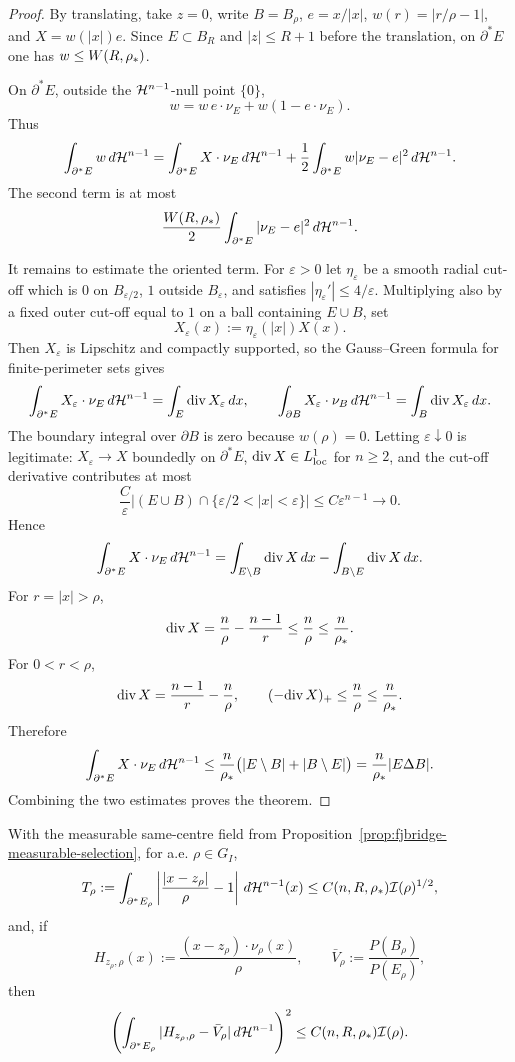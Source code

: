 \begin{proof}
By translating, take \(z=0\), write \(B=B_\rho\),
\(e=x/|x|\), \(w(r)=|r/\rho-1|\), and \(X=w(|x|)e\).  Since
\(E\subset B_R\) and \(|z|\le R+1\) before the translation, on
\(\partial^*E\) one has \(w\le W(R,\rho_*)\).

On \(\partial^*E\), outside the \(\mathcal H^{n-1}\)-null point \(\{0\}\),
\[
   w=w\,e\cdot\nu_E+w(1-e\cdot\nu_E).
\]
Thus
\[
   \int_{\partial^*E}w\,d\mathcal H^{n-1}
   =
   \int_{\partial^*E}X\cdot\nu_E\,d\mathcal H^{n-1}
   +\frac12\int_{\partial^*E}w|\nu_E-e|^2\,d\mathcal H^{n-1}.
\]
The second term is at most
\[
   \frac{W(R,\rho_*)}{2}
   \int_{\partial^*E}|\nu_E-e|^2\,d\mathcal H^{n-1}.
\]

It remains to estimate the oriented term.  For
\(\varepsilon>0\) let \(\eta_\varepsilon\) be a smooth radial cut-off
which is \(0\) on \(B_{\varepsilon/2}\), \(1\) outside \(B_\varepsilon\),
and satisfies \(|\eta_\varepsilon'|\le4/\varepsilon\).  Multiplying
also by a fixed outer cut-off equal to \(1\) on a ball containing
\(E\cup B\), set
\[
   X_\varepsilon(x):=\eta_\varepsilon(|x|)X(x).
\]
Then \(X_\varepsilon\) is Lipschitz and compactly supported, so the
Gauss--Green formula for finite-perimeter sets gives
\[
   \int_{\partial^*E}X_\varepsilon\cdot\nu_E\,d\mathcal H^{n-1}
      =\int_E {\rm div}\,X_\varepsilon\,dx,
   \qquad
   \int_{\partial B}X_\varepsilon\cdot\nu_B\,d\mathcal H^{n-1}
      =\int_B {\rm div}\,X_\varepsilon\,dx.
\]
The boundary integral over \(\partial B\) is zero because \(w(\rho)=0\).
Letting \(\varepsilon\downarrow0\) is legitimate: \(X_\varepsilon\to X\)
boundedly on \(\partial^*E\), \({\rm div}\,X\in L^1_{\rm loc}\) for
\(n\ge2\), and the cut-off derivative contributes at most
\[
   \frac{C}{\varepsilon}
   |(E\cup B)\cap\{\varepsilon/2<|x|<\varepsilon\}|
   \le C\varepsilon^{n-1}\to0.
\]
Hence
\[
   \int_{\partial^*E}X\cdot\nu_E\,d\mathcal H^{n-1}
   =
   \int_{E\setminus B}{\rm div}\,X\,dx
   -\int_{B\setminus E}{\rm div}\,X\,dx.
\]
For \(r=|x|>\rho\),
\[
   {\rm div}\,X=\frac{n}{\rho}-\frac{n-1}{r}
      \le \frac{n}{\rho}\le\frac{n}{\rho_*}.
\]
For \(0<r<\rho\),
\[
   {\rm div}\,X=\frac{n-1}{r}-\frac{n}{\rho},
   \qquad
   (-{\rm div}\,X)_+\le\frac{n}{\rho}\le\frac{n}{\rho_*}.
\]
Therefore
\[
   \int_{\partial^*E}X\cdot\nu_E\,d\mathcal H^{n-1}
   \le \frac{n}{\rho_*}\bigl(|E\setminus B|+|B\setminus E|\bigr)
   =\frac{n}{\rho_*}|E\Delta B|.
\]
Combining the two estimates proves the theorem.
\end{proof}

\begin{corollary}
\label{cor:fjbridge-homothetic-trace}
With the measurable same-centre field from
Proposition~\ref{prop:fjbridge-measurable-selection}, for a.e.
\(\rho\in G_I\),
\[
   T_\rho:=
   \int_{\partial^*E_\rho}
      \left|\frac{|x-z_\rho|}{\rho}-1\right|\,d\mathcal H^{n-1}(x)
   \le C(n,R,\rho_*)\mathcal I(\rho)^{1/2},
\]
and, if
\[
   H_{z_\rho,\rho}(x):=
      \frac{(x-z_\rho)\cdot\nu_\rho(x)}{\rho},
   \qquad
   \bar V_\rho:=\frac{P(B_\rho)}{P(E_\rho)},
\]
then
\[
   \left(
      \int_{\partial^*E_\rho}
         |H_{z_\rho,\rho}-\bar V_\rho|\,d\mathcal H^{n-1}
   \right)^2
   \le C(n,R,\rho_*)\mathcal I(\rho).
\]
\end{corollary}

